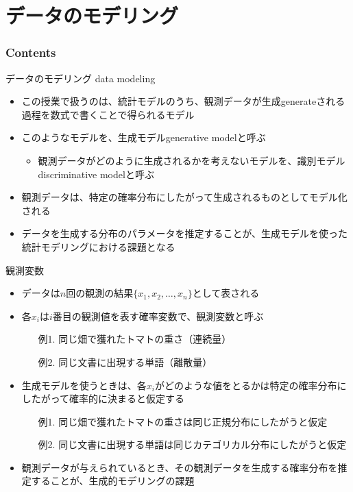 \documentclass[aspectratio=169,unicode,dvipdfmx,14pt]{beamer}
\begin{document}
\section{データのモデリング}

\begin{frame}\frametitle{Contents}
\Large \tableofcontents[currentsection]
\end{frame}

\begin{frame}{データのモデリング data modeling}
\begin{itemize}
\item この授業で扱うのは、統計モデルのうち、観測データが生成generateされる過程を数式で書くことで得られるモデル
\item このようなモデルを、生成モデルgenerative modelと呼ぶ
\begin{itemize}
\item 観測データがどのように生成されるかを考えないモデルを、識別モデルdiscriminative modelと呼ぶ
\end{itemize}
\item 観測データは、特定の確率分布にしたがって生成されるものとしてモデル化される
\item データを生成する分布のパラメータを推定することが、生成モデルを使った統計モデリングにおける課題となる
\end{itemize}
\end{frame}

\begin{frame}{観測変数}
\begin{itemize}
\item データは$n$回の観測の結果$\{x_1,x_2,\ldots,x_n\}$として表される
\item 各$x_i$は$i$番目の観測値を表す確率変数で、観測変数と呼ぶ
\begin{itemize}
\item[例1.] 同じ畑で獲れたトマトの重さ（連続量）
\item[例2.] 同じ文書に出現する単語（離散量）
\end{itemize}
\item 生成モデルを使うときは、各$x_i$がどのような値をとるかは特定の確率分布にしたがって確率的に決まると仮定する
\begin{itemize}
\item[例1.] 同じ畑で獲れたトマトの重さは同じ正規分布にしたがうと仮定
\item[例2.] 同じ文書に出現する単語は同じカテゴリカル分布にしたがうと仮定
\end{itemize}
\item 観測データが与えられているとき、その観測データを生成する確率分布を推定することが、生成的モデリングの課題
\end{itemize}
\end{frame}
\end{document}
